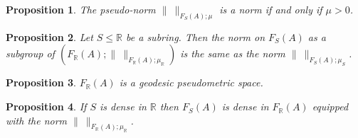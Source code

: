 \documentclass[12pt]{amsart}
\newtheorem{prop}{Proposition}[section]
\theoremstyle{definition}
\def\RR{\ensuremath{\mathbb{R}}}
\def\Free{F}
\begin{document}

\begin{prop}\label{prop:mu>0 => norm} %
The pseudo-norm $\| \ \|_{\Free_S(A);\mu}$ is a norm if and only if $\mu>0$.
\end{prop}

\begin{prop}\label{prop:restriction norms FSA<FRA}
Let $S \leq \RR$ be a subring.
Then  the norm on $\Free_S(A)$ as a subgroup of $(\Free_\RR(A); \| \ \|_{\Free_\RR(A);\mu_\RR})$ is the same as the norm $\| \ \|_{\Free_S(A);\mu_S}$.
\end{prop}

\begin{prop}\label{P:geodesics in F_R(A)}
$\Free_\RR(A)$ is a geodesic pseudometric space.
\end{prop}

\begin{prop}\label{prop:FSA dense FRA}
If $S$ is dense in $\RR$ then $\Free_S(A)$ is dense in $\Free_\RR(A)$ equipped with the norm $\| \ \|_{\Free_\RR(A);\mu_\RR}$.
\end{prop}

\end{document}
